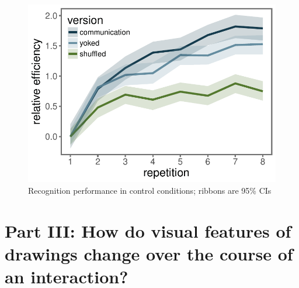 \documentclass[10pt,letterpaper]{article}
\begin{document}





\begin{figure}
\includegraphics[width=\linewidth]{figures/recog_BIS_timeseries.pdf}
\caption{Recognition performance in control conditions; ribbons are 95\% CIs} 
\label{recog_bis}
\end{figure}


\section{Part III: How do visual features of drawings change over the course of an interaction?}
\end{document}
